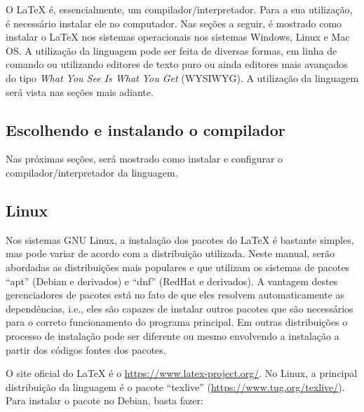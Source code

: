 O \LaTeX{} é, essencialmente, um compilador/interpretador. Para a sua utilização, é necessário instalar ele no computador. Nas seções a seguir, é mostrado como instalar o \LaTeX{} nos sistemas operacionais nos sistemas Windows, Linux e Mac OS. A utilização da linguagem pode ser feita de diversas formas, em linha de comando ou utilizando editores de texto puro ou ainda editores mais avançados do tipo \textit{What You See Is What You Get} (WYSIWYG). A utilização da linguagem será vista nas seções mais adiante.
 
\subsection{Escolhendo e instalando o compilador}
\label{sec:compilador}


Nas próximas seções, será mostrado como instalar e configurar o compilador/interpretador da linguagem. 

\subsection*{Linux}
\label{sec:linux}

Nos sistemas GNU Linux, a instalação dos pacotes do \LaTeX{} é bastante simples, mas pode variar de acordo com a distribuição utilizada. Neste manual, serão abordadas as distribuições mais populares e que utilizam os sistemas de pacotes ``apt'' (Debian e derivados) e ``dnf'' (RedHat e derivados). A vantagem destes gerenciadores de pacotes está no fato de que eles resolvem automaticamente as dependências, i.e., eles são capazes de instalar outros pacotes que são necessários para o correto funcionamento do programa principal. Em outras distribuições o processo de instalação pode ser diferente ou mesmo envolvendo a instalação a partir dos códigos fontes dos pacotes. 

O site oficial do \LaTeX{} é o \url{https://www.latex-project.org/}. No Linux, a principal distribuição da linguagem é o pacote ``texlive'' (\url{https://www.tug.org/texlive/}). Para instalar o pacote no Debian, basta fazer:


